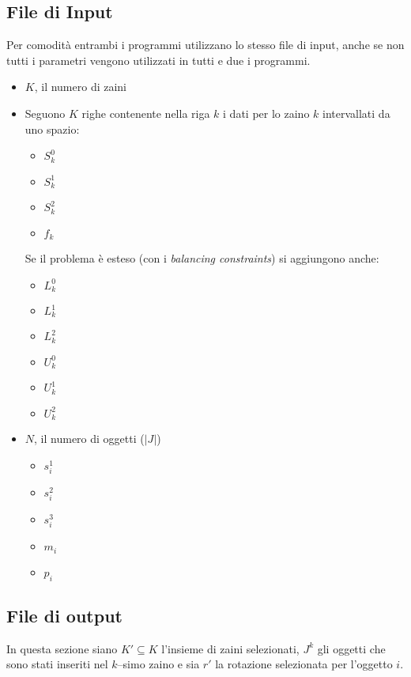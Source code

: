 \documentclass{scrartcl}
\begin{document}
\subsection{File di Input}
Per comodità entrambi i programmi utilizzano lo stesso file di input, anche se non tutti i parametri vengono utilizzati in tutti e due i programmi.
\begin{itemize}
	\item $K$, il numero di zaini
	\item Seguono $K$ righe contenente nella riga $k$ i dati per lo zaino $k$ intervallati da uno spazio:
	\begin{itemize}
		\item $S_k^0$
		\item $S_k^1$
		\item $S_k^2$
		\item $f_k$
	\end{itemize} 
	Se il problema è esteso (con i \emph{balancing constraints}) si aggiungono anche:
	\begin{itemize}
		\item $L_k^0$
		\item $L_k^1$
		\item $L_k^2$
		\item $U_k^0$
		\item $U_k^1$
		\item $U_k^2$
	\end{itemize}
	\item $N$, il numero di oggetti ($|J|$)
	\begin{itemize}
		\item $s_i^1$
		\item $s_i^2$
		\item $s_i^3$
		\item $m_i$
		\item $p_i$
	\end{itemize}
\end{itemize}

\subsection{File di output}
In questa sezione siano $K' \subseteq K$ l'insieme di zaini selezionati, 
$J^k$ gli oggetti che sono stati inseriti nel $k$--simo zaino e sia $r'$ la rotazione selezionata per l'oggetto $i$.
\end{document}
